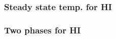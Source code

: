 \begin{frame}
\end{frame} \begin{frame}\frametitle{Steady state temp. for HI}


\end{frame} \begin{frame}\frametitle{Two phases for HI}


\end{frame}

